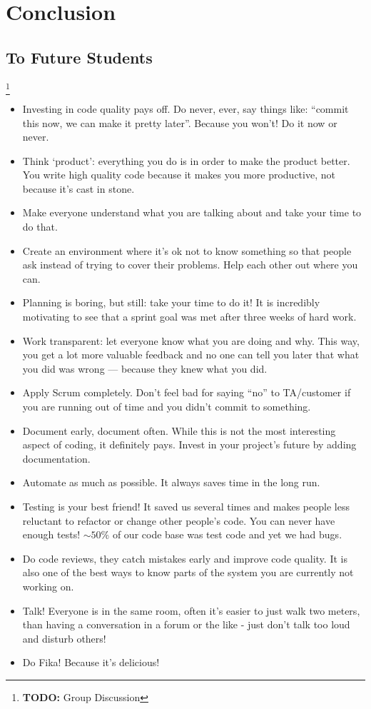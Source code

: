 \documentclass[11pt,a4paper]{report}
\newcommand{\todo}[1]{\footnote{{\color{red} {\bf TODO:} #1}}}
\begin{document}
\chapter{Conclusion}
\section*{To Future Students}
\todo{Group Discussion}
\begin{itemize}
\item  Investing in code quality pays off. Do never, ever, say things like:
``commit this now, we can make it pretty later''. Because you won't!
Do it now or never.
\item Think `product': everything you do is in order to make the product better.
You write high quality code because it makes you more productive, not because
it's cast in stone.
\item Make everyone understand what you are talking about and take your time to
do that.
\item Create an environment where it's ok not to know something so that people
ask instead of trying to cover their problems. Help each other out where you
can.
\item Planning is boring, but still: take your time to do it! It is incredibly
motivating to see that a sprint goal was met after three weeks of hard work.
\item Work transparent: let everyone know what you are doing and why. This way,
you get a lot more valuable feedback and no one can tell you later that what you
did was wrong --- because they knew what you did.
\item Apply Scrum completely. Don't feel bad for saying ``no'' to TA/customer if
you are running out of time and you didn't commit to something.
\item Document early, document often. While this is not the most interesting aspect
of coding, it definitely pays. Invest in your project's future by adding documentation.
\item Automate as much as possible. It always saves time in the long run.
\item Testing is your best friend!
      It saved us several times and makes people less reluctant to refactor
      or change other people's code.
      You can never have enough tests!
      $\sim 50\%$ of our code base was test code and yet we had bugs.
\item Do code reviews, they catch mistakes early and improve code quality.
      It is also one of the best ways to know parts of the system you are
      currently not working on.
\item Talk! Everyone is in the same room, often it's easier to just walk two
      meters, than having a conversation in a forum or the like -
      just don't talk too loud and disturb others!
\item Do Fika! Because it's delicious!
\end{itemize}
\end{document}

